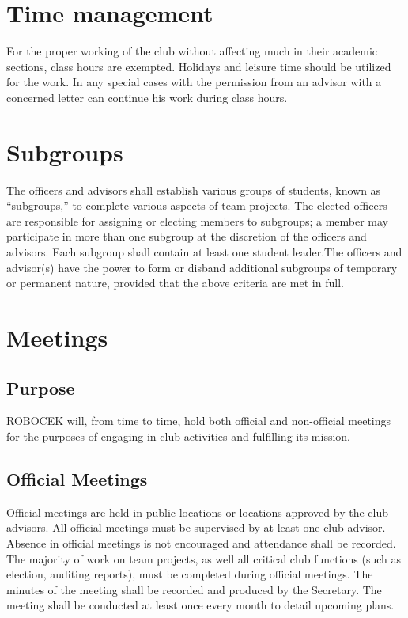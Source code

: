 \section{Time management}
For the proper working of the club without affecting much in their academic sections, class hours are exempted. Holidays and leisure time should be utilized for the work. In any special cases with the permission from an advisor with a concerned letter can continue his work during class hours.

\section{Subgroups}
The officers and advisors shall establish various groups of students, known as “subgroups,” to complete various aspects of team projects. The elected officers are responsible for assigning or electing members to subgroups; a member may participate in more than one subgroup at the discretion of the officers and advisors. Each subgroup shall contain at least one student leader.The officers and advisor(s) have the power to form or disband additional subgroups of temporary or permanent nature, provided that the above criteria are met in full.

\section{Meetings}

\subsection{Purpose}
ROBOCEK will, from time to time, hold both official and non-official meetings for the purposes of engaging in club activities and fulfilling its mission.

\subsection{Official Meetings}
Official meetings are held in public locations or locations approved by the club advisors. All official meetings must be supervised by at least one club advisor. Absence in official meetings is not encouraged and attendance shall be recorded. The majority of work on team projects, as well all critical club functions (such as election, auditing reports), must be completed during official meetings. The minutes of the meeting shall be recorded and produced by the Secretary. The meeting shall be conducted at least once every month to detail upcoming plans.

